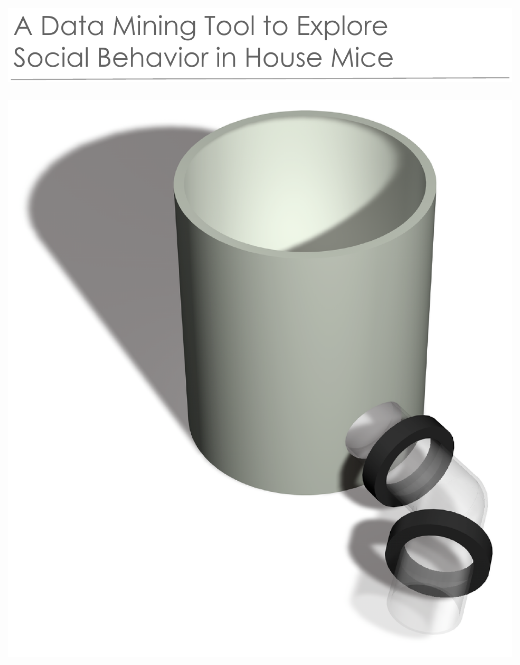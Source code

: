 \documentclass[a4paper,10pt,twoside,titlepage,headings=small,bibliography=totocnumbered,headsepline]{scrartcl}
\begin{document}


\begin{titlepage}
\thispagestyle{empty}
\begin{flushleft}
\includegraphics[width=\textwidth]{assets/pdf/title_header.pdf}
\end{flushleft}
\vspace{3cm}
\begin{adjustwidth}{-.5cm}{-2cm}%
\includegraphics[width=.8\textwidth]{assets/pdf/title_box.pdf}
\end{adjustwidth}
\vfill

\begin{figure}[htpb]%
	\hfill
\end{figure}	 



\end{titlepage}
\end{document}
